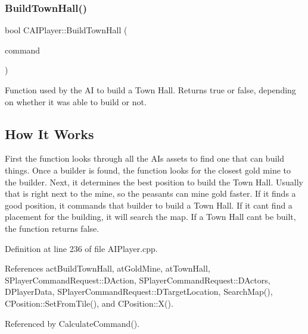 \hypertarget{classCAIPlayer_a41cdefbe14210fb70b793a32778c5141}{}\label{classCAIPlayer_a41cdefbe14210fb70b793a32778c5141} 
\subsubsection{\texorpdfstring{Build\+Town\+Hall()}{BuildTownHall()}}
{\footnotesize\ttfamily bool C\+A\+I\+Player\+::\+Build\+Town\+Hall (\begin{DoxyParamCaption}\item[{\hyperlink{structSPlayerCommandRequest}{S\+Player\+Command\+Request} \&}]{command }\end{DoxyParamCaption})\hspace{0.3cm}{\ttfamily [protected]}}



Function used by the AI to build a Town Hall. Returns true or false, depending on whether it was able to build or not. 

\hypertarget{classCAIPlayer_bthhow_sec}{}\subsection{How It Works}\label{classCAIPlayer_bthhow_sec}
First the function looks through all the AI\textquotesingle{}s assets to find one that can build things. Once a builder is found, the function looks for the closest gold mine to the builder. Next, it determines the best position to build the Town Hall. Usually that is right next to the mine, so the peasants can mine gold faster. If it finds a good position, it commands that builder to build a Town Hall. If it can\textquotesingle{}t find a placement for the building, it will search the map. If a Town Hall can\textquotesingle{}t be built, the function returns false. 

Definition at line 236 of file A\+I\+Player.\+cpp.



References act\+Build\+Town\+Hall, at\+Gold\+Mine, at\+Town\+Hall, S\+Player\+Command\+Request\+::\+D\+Action, S\+Player\+Command\+Request\+::\+D\+Actors, D\+Player\+Data, S\+Player\+Command\+Request\+::\+D\+Target\+Location, Search\+Map(), C\+Position\+::\+Set\+From\+Tile(), and C\+Position\+::\+X().



Referenced by Calculate\+Command().


